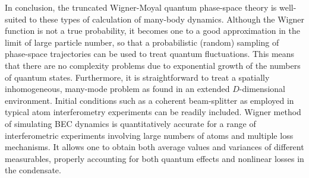 \documentclass[aps,prl,twocolumn,showpacs,amsmath,amssymb,superscriptaddress,flushbottom,noraggedfooter]{revtex4-1}
\begin{document}
In conclusion, the truncated Wigner-Moyal quantum phase-space theory is
well-suited to these types of calculation of many-body dynamics.
Although the Wigner function is not a true probability, it becomes one
to a good approximation in the limit of large particle number, so that
a probabilistic (random) sampling of phase-space trajectories can be used
to treat quantum fluctuations.
This means that there are no complexity problems due to exponential growth
of the numbers of quantum states.
Furthermore, it is straightforward to treat a spatially inhomogeneous,
many-mode problem as found in an extended $D$-dimensional environment.
Initial conditions such as a coherent beam-splitter as employed in typical
atom interferometry experiments can be readily included.
Wigner method of simulating BEC dynamics is quantitatively accurate
for a range of interferometric experiments involving large numbers of atoms and multiple loss mechanisms.
It allows one to obtain both average values and variances of different measurables,
properly accounting for both quantum effects and nonlinear losses in the condensate.


\end{document}
